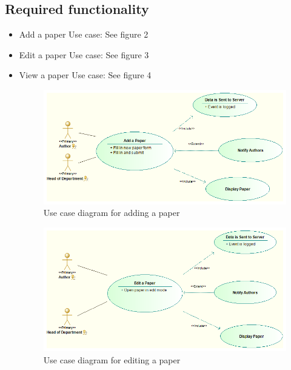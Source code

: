 \documentclass[english]{article}
\begin{document}
		\subsection{Required functionality}
			\begin{itemize}
				\item	Add a paper Use case: See figure 2
				\item   Edit a paper Use case: See figure 3
				\item   View a paper Use case: See figure 4
				\begin{figure}
					\includegraphics[width=\linewidth]{Add A Paper Use Case}
					\caption{Use case diagram for adding a paper}
				\end{figure}
				
				\begin{figure}
					\includegraphics[width=\linewidth]{Edit a Paper Use Case}
					\caption{Use case diagram for editing a paper}
				\end{figure}
				

\end{itemize}
\end{document}
